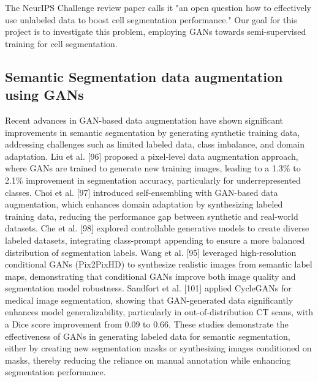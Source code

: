 \documentclass[]{article}
\begin{document}
The NeurIPS Challenge review paper \cite{NeurIPS-CellSeg} calls it "an open
question how to effectively use unlabeled data to boost cell segmentation performance." Our goal for this project is to investigate this problem, employing GANs towards semi-supervised training for cell segmentation.

\subsection{Semantic Segmentation data augmentation using GANs}
Recent advances in GAN-based data augmentation have shown significant improvements in semantic segmentation by generating synthetic training data, addressing challenges such as limited labeled data, class imbalance, and domain adaptation. Liu et al. [96] proposed a pixel-level data augmentation approach, where GANs are trained to generate new training images, leading to a 1.3\% to 2.1\% improvement in segmentation accuracy, particularly for underrepresented classes. Choi et al. [97] introduced self-ensembling with GAN-based data augmentation, which enhances domain adaptation by synthesizing labeled training data, reducing the performance gap between synthetic and real-world datasets. Che et al. [98] explored controllable generative models to create diverse labeled datasets, integrating class-prompt appending to ensure a more balanced distribution of segmentation labels. Wang et al. [95] leveraged high-resolution conditional GANs (Pix2PixHD) to synthesize realistic images from semantic label maps, demonstrating that conditional GANs improve both image quality and segmentation model robustness. Sandfort et al. [101] applied CycleGANs for medical image segmentation, showing that GAN-generated data significantly enhances model generalizability, particularly in out-of-distribution CT scans, with a Dice score improvement from 0.09 to 0.66. These studies demonstrate the effectiveness of GANs in generating labeled data for semantic segmentation, either by creating new segmentation masks or synthesizing images conditioned on masks, thereby reducing the reliance on manual annotation while enhancing segmentation performance.
\end{document}
